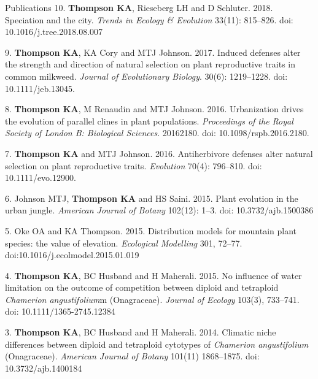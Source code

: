 \documentclass[11pt]{article}
\begin{document}
\begin{rSection}{Publications}
\noindent\hspace{.1cm}10. \textbf{Thompson KA}, Rieseberg LH and D Schluter. 2018. Speciation and the city. \textit{Trends in Ecology & Evolution} 33(11): 815–826. doi: 10.1016/j.tree.2018.08.007

\noindent\hspace{.1cm}9. \textbf{Thompson KA}, KA Cory and MTJ Johnson. 2017. Induced defenses alter the strength and direction of natural selection on plant reproductive traits in common milkweed. \textit{Journal of Evolutionary Biology}. 30(6): 1219–1228. doi: 10.1111/jeb.13045.

\noindent\hspace{.1cm}8. \textbf{Thompson KA}, M Renaudin and MTJ Johnson. 2016. Urbanization drives the evolution of parallel clines in plant populations. \textit{Proceedings of the Royal Society of London B: Biological Sciences}. 20162180. doi: 10.1098/rspb.2016.2180.

\noindent\hspace{.1cm}7. \textbf{Thompson KA} and MTJ Johnson. 2016. Antiherbivore defenses alter natural selection on plant reproductive traits. \textit{Evolution} 70(4): 796–810. doi: 10.1111/evo.12900.

\noindent\hspace{.1cm}6. Johnson MTJ, \textbf{Thompson KA} and HS Saini. 2015. Plant evolution in the urban jungle. \textit{American Journal of Botany} 102(12): 1–3. doi: 10.3732/ajb.1500386

\noindent\hspace{.1cm}5. Oke OA and KA Thompson. 2015. Distribution models for mountain plant species: the value of elevation. \textit{Ecological Modelling} 301, 72–77. doi:10.1016/j.ecolmodel.2015.01.019

\noindent\hspace{.1cm}4. \textbf{Thompson KA}, BC Husband and H Maherali. 2015. No influence of water limitation on the outcome of competition between diploid and tetraploid \textit{Chamerion angustifolium}m (Onagraceae). \textit{Journal of Ecology} 103(3), 733–741. doi: 10.1111/1365-2745.12384

\noindent\hspace{.1cm}3. \textbf{Thompson KA}, BC Husband and H Maherali. 2014. Climatic niche differences between diploid and tetraploid cytotypes of \textit{Chamerion angustifolium} (Onagraceae). \textit{American Journal of Botany} 101(11) 1868–1875. doi: 10.3732/ajb.1400184 


\end{rSection}
\end{document}
